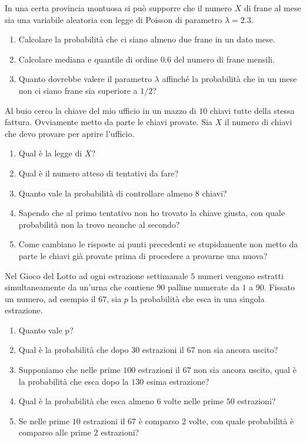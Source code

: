 In una certa provincia montuosa si può supporre che il numero $X$ di frane al mese sia una variabile aleatoria con legge di Poisson di parametro $\lambda =2.3$.
\begin{enumerate}
\item Calcolare la probabilità che ci siano almeno due frane in un dato mese.
\item Calcolare mediana e quantile di ordine $0.6$ del numero di frane mensili.
\item Quanto dovrebbe valere il parametro $\lambda $ affinché la probabilità che in un mese non ci siano frane sia superiore a $1/2$?
\end{enumerate}
\Esercizio{}

Al buio cerco la chiave del mio ufficio in un mazzo di $10$ chiavi tutte della stessa fattura. Ovviamente metto da parte le chiavi provate. Sia $X$ il numero di chiavi che devo provare per aprire l'ufficio.
\begin{enumerate}
\item Qual è la legge di $X$?
\item Qual è il numero atteso di tentativi da fare?
\item Quanto vale la probabilità di controllare almeno $8$ chiavi?
\item Sapendo che al primo tentativo non ho trovato la chiave giusta, con quale probabilità non la trovo neanche al secondo?
\item Come cambiano le risposte ai punti precedenti se stupidamente non metto da parte le chiavi già provate prima di procedere a provarne una nuova?
\end{enumerate}
\Esercizio{}

Nel Gioco del Lotto ad ogni estrazione settimanale $5$ numeri vengono estratti simultaneamente da un'urna che contiene $90$ palline numerate da $1$ a $90$. Fissato un numero, ad esempio il $67$, sia $p$ la probabilità che esca in una singola estrazione.
\begin{enumerate}
\item Quanto vale p?
\item Qual è la probabilità che dopo $30$ estrazioni il $67$ non sia ancora uscito?
\item Supponiamo che nelle prime $100$ estrazioni il $67$ non sia ancora uscito, qual è la probabilità che esca dopo la $130$ esima estrazione?
\item Qual è la probabilità che esca almeno $6$ volte nelle prime $50$ estrazioni?
\item Se nelle prime $10$ estrazioni il $67$ è comparso $2$ volte, con quale probabilità è comparso alle prime $2$ estrazioni?
\end{enumerate}

